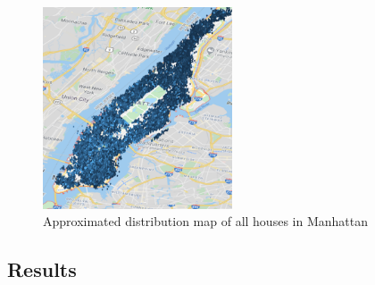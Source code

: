 \documentclass{FR16}
\begin{document}
\begin{figure}[H]
\centering
\includegraphics[width=0.5\textwidth]{figures/figure4.PNG} 
\caption{\label{fig:4}  Approximated distribution map of all houses in Manhattan }
\end{figure}



\subsection{Results}
\end{document}
